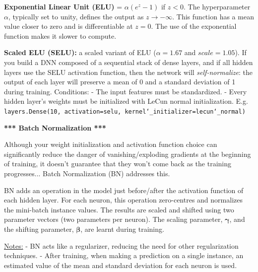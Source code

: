 \textbf{Exponential Linear Unit (ELU)} = $\alpha(e^z - 1)$ if $z < 0$.
The hyperparameter $\alpha$, typically set to unity, defines the output as $z \rightarrow -\infty$.
This function has a mean value closer to zero and is differentiable at $z=0$.
The use of the exponential function makes it slower to compute.

\textbf{Scaled ELU (SELU):} a scaled variant of ELU ($\alpha = 1.67$ and $scale = 1.05$).\newline
If you build a DNN composed of a sequential stack of dense layers,
and if all hidden layers use the SELU activation function,
then the network will \textit{self-normalize}:
the output of each layer will preserve a mean of 0 and a standard deviation of 1 during training. Conditions:\newline
- The input features must be standardized.\newline
- Every hidden layer's weights must be initialized with LeCun normal initialization. E.g.\newline
\texttt{layers.Dense(10, activation=\textquotesingle selu\textquotesingle, kernel\char`_initializer=\textquotesingle lecun\char`_normal\textquotesingle)}\newline

\textbf{*** Batch Normalization ***}

Although your weight initialization and activation function choice can significantly reduce the danger of vanishing/exploding gradients at the beginning of training,
it doesn't guarantee that they won't come back as the training progresses... Batch Normalization (BN) addresses this.

BN adds an operation in the model just before/after the activation function of each hidden layer.
For each neuron, this operation zero-centres and normalizes the mini-batch instance values.\newline
The results are scaled and shifted using two parameter vectors (two parameters per neuron).\newline
The scaling parameter, $\boldsymbol{\gamma}$, and the shifting parameter, $\boldsymbol{\beta}$, are learnt during training.

\underline{Notes:}\newline
- BN acts like a regularizer, reducing the need for other regularization techniques.\newline
- After training, when making a prediction on a single instance,
an estimated value of the mean and standard deviation for each neuron is used.

